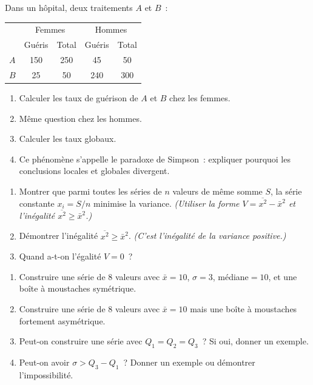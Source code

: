 \begin{challenge}
Dans un h\^opital, deux traitements $A$ et $B$~:
\begin{center}
\begin{tabular}{|l|cc|cc|}
\hline
\rowcolor{BN!10} & \multicolumn{2}{c|}{Femmes} & \multicolumn{2}{c|}{Hommes} \\
\rowcolor{BN!10} & Gu\'eris & Total & Gu\'eris & Total \\
\hline
$A$ & 150 & 250 & 45 & 50 \\
$B$ & 25 & 50 & 240 & 300 \\
\hline
\end{tabular}
\end{center}
\begin{enumerate}
  \item Calculer les taux de gu\'erison de $A$ et $B$ chez les femmes.
  \item M\^eme question chez les hommes.
  \item Calculer les taux globaux.
  \item Ce ph\'enom\`ene s'appelle le paradoxe de Simpson~:
        expliquer pourquoi les conclusions locales et globales divergent.
\end{enumerate}
\end{challenge}

\begin{challenge}
\begin{enumerate}
  \item Montrer que parmi toutes les s\'eries de $n$ valeurs de m\^eme
        somme $S$, la s\'erie constante $x_i=S/n$ minimise la variance.
        \emph{(Utiliser la forme $V=\overline{x^2}-\bar{x}^2$ et
        l'in\'egalit\'e $\overline{x^2}\geq\bar{x}^2$.)}
  \item D\'emontrer l'in\'egalit\'e $\overline{x^2}\geq\bar{x}^2$.
        \emph{(C'est l'in\'egalit\'e de la variance positive.)}
  \item Quand a-t-on l'\'egalit\'e $V=0$~?
\end{enumerate}
\end{challenge}

\begin{challenge}
\begin{enumerate}
  \item Construire une s\'erie de $8$ valeurs avec $\bar{x}=10$,
        $\sigma=3$, m\'ediane$=10$, et une bo\^ite \`a moustaches sym\'etrique.
  \item Construire une s\'erie de $8$ valeurs avec $\bar{x}=10$
        mais une bo\^ite \`a moustaches fortement asym\'etrique.
  \item Peut-on construire une s\'erie avec $Q_1=Q_2=Q_3$~? Si oui, donner un exemple.
  \item Peut-on avoir $\sigma > Q_3-Q_1$~? Donner un exemple ou d\'emontrer l'impossibilit\'e.
\end{enumerate}
\end{challenge}

